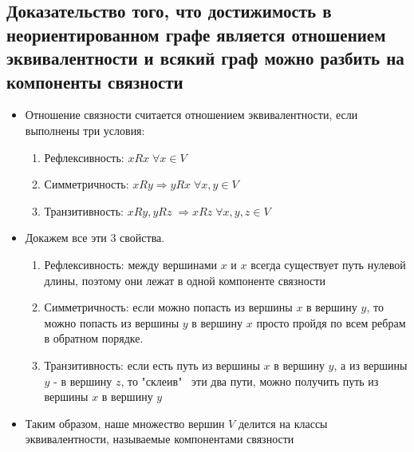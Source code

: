 \subsection{Доказательство того, что достижимость в неориентированном графе является отношением эквивалентности и всякий граф можно разбить на компоненты связности}
\begin{itemize}
    \item
        Отношение связности считается отношением эквивалентности, если выполнены три условия:
        \begin{enumerate}
        \item Рефлексивность: $xRx \; \forall x \in V$
        \item Симметричность: $xRy \Rightarrow yRx \; \forall x, y \in V$
        \item Транзитивность: $xRy, yRz \; \Rightarrow xRz \; \forall x, y, z \in V$
        \end{enumerate}
    \item
    Докажем все эти 3 свойства.
        \begin{enumerate}
        \item
        Рефлексивность: между вершинами $x$ и $x$ всегда существует путь нулевой длины, поэтому они лежат в одной компоненте связности

        \item
        Симметричность: если можно попасть из вершины $x$ в вершину $y$, то можно попасть из вершины $y$ в вершину $x$ просто пройдя по всем ребрам в обратном порядке.

        \item
        Транзитивность: если есть путь из вершины $x$ в вершину $y$, а из вершины $y$ - в вершину $z$, то "склеив" \, эти два пути, можно получить путь из вершины $x$ в вершину $y$

        \end{enumerate}
    \item
    Таким образом, наше множество вершин $V$ делится на классы эквивалентности, называемые компонентами связности

\end{itemize}

